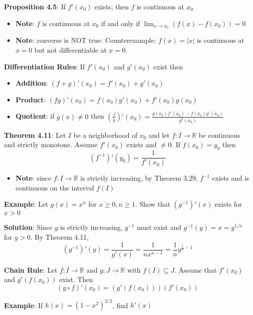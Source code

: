 \documentclass{article}
\begin{document}
    \textbf{Proposition 4.5}: If $f'(x_0)$ exists, then $f$ is continuous at $x_0$
    \begin{itemize}
      \item \textbf{Note}: $f$ is continuous at $x_0$ if and only if $\lim_{x \rightarrow x_0}(f(x) - f(x_0)) = 0$
      \item \textbf{Note}: converse is NOT true. Counterexample: $f(x) = |x|$ is continuous at $x = 0$ but not differentiable at $x= 0$.
    \end{itemize}

    \textbf{Differentiation Rules}: If $f'(x_0)$ and $g'(x_0)$ exist then
    \begin{itemize}
      \item \textbf{Addition}: $(f+g)'(x_0) = f'(x_0) + g'(x_0)$
      \item \textbf{Product}: $(fg)'(x_0) = f(x_0)g'(x_0) + f'(x_0)g(x_0)$
      \item \textbf{Quotient}: if $g(x) \neq 0$ then $(\frac{f}{g})'(x_0) = \frac{g(x_0)f'(x_0) - f(x_0)g'(x_0)}{g^2(x_0)}$
    \end{itemize}
    
    \textbf{Theorem 4.11}: Let $I$ be a neighborhood of $x_0$ and let $f \colon I \rightarrow \mathbb{R}$ be continuous and strictly monotone. Assume $f'(x_0)$ exists and $\neq 0$. If $f(x_0) = y_0$ then
    \[(f^{-1})'(y_0) = \frac{1}{f'(x_0)}\]
    \begin{itemize}
      \item \textbf{Note}: since $f \colon I \rightarrow \mathbb{R}$ is strictly increasing, by Theorem 3.29, $f^{-1}$ exists and is continuous on the interval $f(I)$
    \end{itemize}

    \textbf{Example}: Let $g(x) = x^n$ for $x \geq 0, n \geq 1$. Show that $(g^{-1})'(x)$ exists for $x > 0$

    \textbf{Solution}: Since $g$ is strictly increasing, $g^{-1}$ must exist and $g^{-1}(y) = x = y^{1/n}$ for $y > 0$. By Theorem 4.11,
    \[(g^{-1})'(y) = \frac{1}{g'(x)} = \frac{1}{nx^{n-1}} = \frac{1}{n}y^{\frac{1}{n} - 1}\] \bigskip

    \textbf{Chain Rule}: Let $f \colon I \rightarrow \mathbb{R}$ and $g \colon J \rightarrow \mathbb{R}$ with $f(I) \subseteq J$. Assume that $f'(x_0)$ and $g'(f(x_0))$ exist. Then
    \[(g \circ f)'(x_0) = (g'(f(x_0)))(f'(x_0))\]
    
    \textbf{Example}: If $h(x) = (1-x^2)^{3/2}$, find $h'(x)$
    
\end{document}
